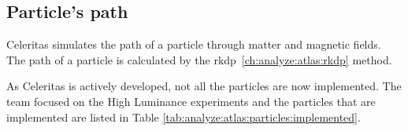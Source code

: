 \begin{table}[ht]
    \label{tab:analyze:atlas:rkdp:butcher}
\end{table}



\subsection{Particle's path}
\label{ch:analyze:atlas:path}

Celeritas simulates the path of a particle through matter and magnetic fields.
The path of a particle is calculated by the \acrshort{rkdp}~\ref{ch:analyze:atlas:rkdp} method.


As Celeritas is actively developed, not all the particles are now implemented.
The team focused on the High Luminance experiments and the particles that are
implemented are listed in Table \ref{tab:analyze:atlas:particles:implemented}.

